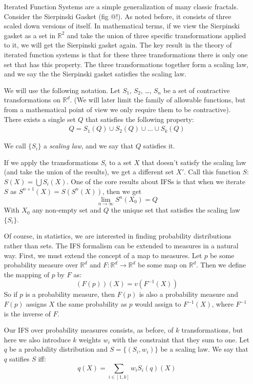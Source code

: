 \documentclass[10pt]{article}
\theoremstyle{definition}
\begin{document}
Iterated Function Systems are a simple generalization of many classic fractals. Consider the Sierpinski Gasket (fig @!). As noted before, it consists of three scaled down versions of itself. In mathematical terms, if we view the Sierpinski gasket as a set in ${\mathbb R}^2$ and take the union of three specific transformations applied to it, we will get the Sierpinski gasket again. The key result in the theory of iterated function systems is that for these three transformations there is only one set that has this property. The three transformations together form a scaling law, and we say the the Sierpinski gasket satisfies the scaling law.

We will use the following notation. Let $S_1$, $S_2$, \ldots, $S_n$ be a set of contractive transformations on ${\mathbb R}^d$. (We will later limit the family of allowable functions, but from a mathematical point of view we only require them to be contractive). There exists a single set $Q$ that satisfies the following property:
\begin{align}
Q = S_1(Q) \cup S_2(Q) \cup \ldots \cup S_k(Q) \label{scaling law}
\end{align}

We call $\{S_i\}$ a \textit{scaling law}, and we say that $Q$ satisfies it.
 
If we apply the transformations $S_i$ to a set $X$ that doesn't satisfy the scaling law (and take the union of the results), we get a different set $X'$. Call this function $S$: $S(X) = \bigcup S_i(X)$. One of the core results about IFSs is that when we iterate $S$ as $S^{n+1}(X) = S(S^n(X))$, then we get 
\[
\lim_{n \rightarrow \infty} S^n(X_0) = Q
\]
With $X_0$ any non-empty set and $Q$ the unique set that satisfies the scaling law $\{S_i\}$.

Of course, in statistics, we are interested in finding probability distributions rather than sets. The IFS formalism can be extended to measures in a natural way. First, we must extend the concept of a map to measures. Let $p$ be some probability measure over ${\mathbb R}^d$ and $F:{\mathbb R}^d \rightarrow {\mathbb R}^d$ be some map on ${\mathbb R}^d$. Then we define the mapping of $p$ by $F$ as:
\[
(F(p))(X) = v(F^{-1}(X))
\]
So if $p$ is a probability measure, then $F(p)$ is also a probability measure and $F(p)$ assigns $X$ the same probability as $p$ would assign to $F^{-1}(X)$, where $F^{-1}$ is the inverse of $F$.

Our IFS over probability measures consists, as before, of $k$ transformations, but here we also introduce $k$ weights $w_i$ with the constraint that they sum to one. Let $q$ be a probability distribution and $S = \{(S_i, w_i)\}$ be a scaling law. We say that $q$ satifies $S$ iff:
\[
q(X) = \sum_{i\in[1, k]} w_i S_i(q)(X)
\] 
\end{document}
